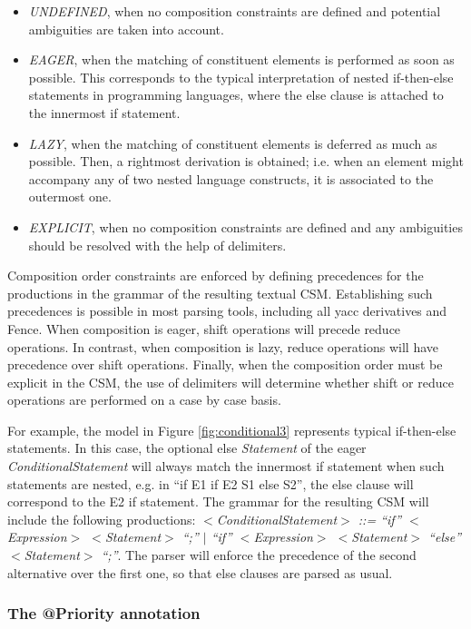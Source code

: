 \documentclass[a4paper,twoside,onecolumn]{article}
\newcommand{\etexttt}[1]{\textit{#1}}
\newcommand{\an}[1]{\emph{#1}} %
\begin{document}
\begin{itemize}
\item \an{UNDEFINED}, when no composition constraints are defined and potential ambiguities are taken into account.
\item \an{EAGER}, when the matching of constituent elements is performed as soon as possible.
      This corresponds to the typical interpretation of nested if-then-else statements in programming languages, where the else clause is attached to the innermost if statement.
\item \an{LAZY}, when the matching of constituent elements is deferred as much as possible.
      Then, a rightmost derivation is obtained; i.e. when an element might accompany any of two nested language constructs, it is associated to the outermost one.
\item \an{EXPLICIT}, when no composition constraints are defined and any ambiguities should be resolved with the help of delimiters.
\end{itemize}

Composition order constraints are enforced by defining precedences for the productions in the grammar of the resulting textual CSM.
Establishing such precedences is possible in most parsing tools, including all yacc  derivatives and Fence.
When composition is eager, shift operations will precede reduce operations.
In contrast, when composition is lazy, reduce operations will have precedence over shift operations.
Finally, when the composition order must be explicit in the CSM, the use of delimiters will determine whether shift or reduce operations are performed on a case by case basis.

For example, the model in Figure \ref{fig:conditional3} represents typical if-then-else statements.
In this case, the optional else \emph{Statement} of the eager \emph{ConditionalStatement} will always match the innermost if statement when such statements are nested, e.g. in
``if E1 if E2 S1 else S2'', the else clause will correspond to the E2 if statement.
The grammar for the resulting CSM will include the following productions: \etexttt{$<$ConditionalStatement$>$ ::= ``if'' $<$Expression$>$ $<$Statement$>$ ``;'' $|$ ``if'' $<$Expression$>$ $<$Statement$>$ ``else'' $<$Statement$>$ ``;''}.
The parser will enforce the precedence of the second alternative over the first one, so that else clauses are parsed as usual.

\subsubsection{The @Priority annotation}
\end{document}
